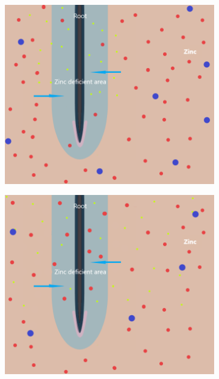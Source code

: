 \documentclass[11pt]{article}
\begin{document}
\begin{figure}[h]
\centering
\begin{subfigure}[t]{0.4\textwidth}
    \includegraphics[width=\textwidth]{RootZincDiagram.png}
    \caption{
    }
    \label{fig:Zinc}
\end{subfigure}
\qquad
\begin{subfigure}[t]{0.4\textwidth}
    \includegraphics[width=\textwidth]{RootZincDiagram2.png}

\end{subfigure}
\end{figure}
\end{document}
